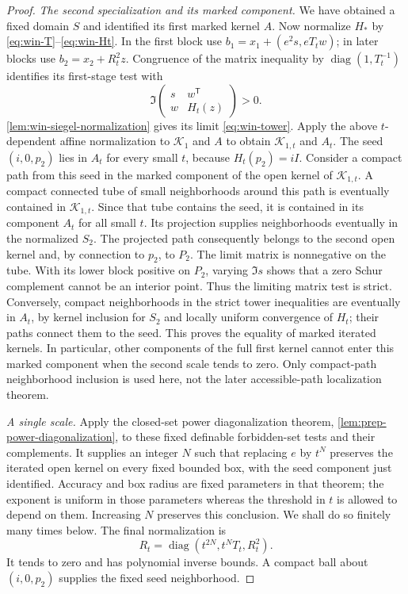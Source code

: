 \begin{proof}
\emph{The second specialization and its marked component.} We have obtained a fixed domain $S$ and identified its first marked kernel $A$.  Now normalize $H_*$ by \eqref{eq:win-T}--\eqref{eq:win-Ht}. In the first block use $b_1=x_1+(e^2s,eT_tw)$; in later blocks use $b_2=x_2+R_t^2z$.  Congruence of the matrix inequality by $\operatorname{diag}(1,T_t^{-1})$ identifies its first-stage test with
\[
              \Im\begin{pmatrix}s&w^{\mathsf T}\\w&H_t(z)\end{pmatrix}>0.
\]
\cref{lem:win-siegel-normalization} gives its limit \eqref{eq:win-tower}.  Apply the above $t$-dependent affine normalization to $\mathcal{K}_1$ and $A$ to obtain $\mathcal{K}_{1,t}$ and $A_t$. The seed $(i,0,p_2)$ lies in $A_t$ for every small $t$, because $H_t(p_2)=iI$.  Consider a compact path from this seed in the marked component of the open kernel of $\mathcal{K}_{1,t}$. A compact connected tube of small neighborhoods around this path is eventually contained in $\mathcal{K}_{1,t}$.  Since that tube contains the seed, it is contained in its component $A_t$ for all small $t$.  Its projection supplies neighborhoods eventually in the normalized $S_2$.  The projected path consequently belongs to the second open kernel and, by connection to $p_2$, to $P_2$. The limit matrix is nonnegative on the tube.  With its lower block positive on $P_2$, varying $\Im s$ shows that a zero Schur complement cannot be an interior point.  Thus the limiting matrix test is strict.  Conversely, compact neighborhoods in the strict tower inequalities are eventually in $A_t$, by kernel inclusion for $S_2$ and locally uniform convergence of $H_t$; their paths connect them to the seed.  This proves the equality of marked iterated kernels.  In particular, other components of the full first kernel cannot enter this marked component when the second scale tends to zero.  Only compact-path neighborhood inclusion is used here, not the later accessible-path localization theorem.

\emph{A single scale.} Apply the closed-set power diagonalization theorem, \cref{lem:prep-power-diagonalization}, to these fixed definable forbidden-set tests and their complements.  It supplies an integer $N$ such that replacing $e$ by $t^N$ preserves the iterated open kernel on every fixed bounded box, with the seed component just identified.  Accuracy and box radius are fixed parameters in that theorem; the exponent is uniform in those parameters whereas the threshold in $t$ is allowed to depend on them.  Increasing $N$ preserves this conclusion.  We shall do so finitely many times below.  The final normalization is
\begin{equation}\label{eq:win-Rt}
          R_t=\operatorname{diag}
                     (t^{2N},t^NT_t,R_t^2).
\end{equation}
It tends to zero and has polynomial inverse bounds.  A compact ball about $(i,0,p_2)$ supplies the fixed seed neighborhood.


\end{proof}
